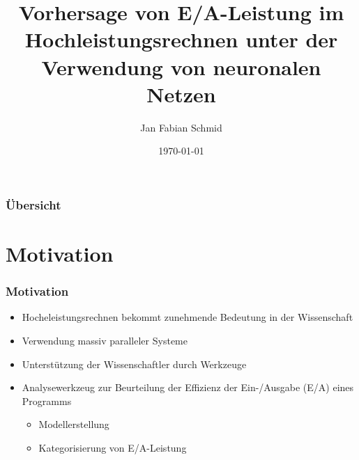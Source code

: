 \documentclass{beamer}
\title[E/A-Leistungsvorhersage im HPC]{Vorhersage von E/A-Leistung im Hochleistungsrechnen unter der Verwendung von neuronalen Netzen} %
\author{Jan Fabian Schmid} %
\institute[UHH] %
{
Universität Hamburg \\ %
\medskip
\textit{2schmid@informatik.uni-hamburg.de} %
}
\date{\today} %
\begin{document}
\begin{frame}
\titlepage %
\end{frame}

\begin{frame}
\frametitle{Übersicht} %
\tableofcontents %
\end{frame}


\section{Motivation}
\begin{frame}
\frametitle{Motivation}
\begin{itemize}
	\item Hocheleistungsrechnen bekommt zunehmende Bedeutung in der Wissenschaft
	\pause
	\item Verwendung massiv paralleler Systeme
	\pause	
	\item Unterstützung der Wissenschaftler durch Werkzeuge
	\pause
	\item Analysewerkzeug zur Beurteilung der Effizienz der Ein-/Ausgabe (E/A) eines Programms
	\begin{itemize}
		\pause
		\item Modellerstellung
		\pause		
		\item Kategorisierung von E/A-Leistung
	\end{itemize}			
\end{itemize}
\end{frame}
\end{document}
